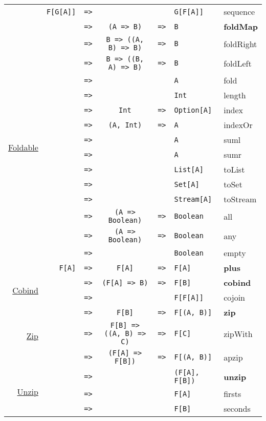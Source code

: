 \documentclass{tufte-handout}
\newcommand{\fa}{F[A]}
\newcommand{\fb}{F[B]}
\newcommand{\rarr}{\texttt{=>}}
\newcommand{\fTwo}[2]{\texttt{#1} & \rarr & & & \texttt{#2}}
\newcommand{\fThree}[3]{\texttt{#1} & \rarr & \texttt{#2} & \rarr & \texttt{#3}}
\newcommand{\sdocUrl}[1]{http://docs.typelevel.org/api/scalaz/stable/7.0.4/doc/\#scalaz.#1}
\newcommand{\sdocHref}[1]{\href{\sdocUrl{#1}}{#1}}
\begin{document}
\begin{table}[ht]
\begin{tabular}{rrcclll}
      & \fTwo{F[G[A]]}{G[F[A]]} & sequence \\[.5cm]
    \multirow{16}{*}{\sdocHref{Foldable}}
      & \fThree{\multirow{16}{*}{\fa}}{(A => B)}{B} & \textbf{foldMap} \\
      & \fThree{}{B => ((A, B) => B)}{B} & foldRight \\
      & \fThree{}{B => ((B, A) => B)}{B} & foldLeft \\
      & \fTwo{}{A} & fold \\
      & \fTwo{}{Int} & length \\
      & \fThree{}{Int}{Option[A]} & index \\
      & \fThree{}{(A, Int)}{A} & indexOr \\
      & \fTwo{}{A} & suml \\
      & \fTwo{}{A} & sumr \\
      & \fTwo{}{List[A]} & toList \\
      & \fTwo{}{Set[A]} & toSet \\
      & \fTwo{}{Stream[A]} & toStream \\
      & \fThree{}{(A => Boolean)}{Boolean} & all \\
      & \fThree{}{(A => Boolean)}{Boolean} & any \\
      & \fTwo{}{Boolean} & empty \\[.5cm]
    \sdocHref{Plus}
      & \fThree{\fa}{\fa}{\fa} & \textbf{plus} \\[.5cm]
    \multirow{2}{*}{\sdocHref{Cobind}}
      & \fThree{\multirow{2}{*}{\fa}}{(F[A] => B)}{\fb} & \textbf{cobind} \\
      & \fTwo{}{F[\fa]} & cojoin \\[.5cm]
    \multirow{3}{*}{\sdocHref{Zip}}
      & \fThree{\multirow{3}{*}{\fa}}{\fb}{F[(A, B)]} & \textbf{zip} \\
      & \fThree{}{F[B] => ((A, B) => C)}{F[C]} & zipWith \\
      & \fThree{}{(F[A] => F[B])}{F[(A, B)]} & apzip \\[.5cm]
    \multirow{3}{*}{\sdocHref{Unzip}}
      & \fTwo{\multirow{3}{*}{F[(A, B)]}}{(\fa, \fb)} & \textbf{unzip} \\
      & \fTwo{}{\fa} & firsts \\
      & \fTwo{}{\fb} & seconds \\[.5cm]
  \end{tabular}
\end{table}




\end{document}
